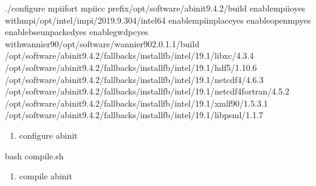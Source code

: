 \documentclass[a4paper,12pt,english]{sphinxmanual}
\begin{document}
\begin{sphinxVerbatim}[commandchars=\\\{\}]
./configure mpiifort mpiicc 
\PYGZhy{}\PYGZhy{}prefix/opt/software/abinit\PYGZhy{}9.4.2/build 
\PYGZhy{}\PYGZhy{}enable\PYGZhy{}mpi\PYGZhy{}ioyes 
\PYGZhy{}\PYGZhy{}with\PYGZhy{}mpi/opt/intel/impi/2019.9.304/intel64 
\PYGZhy{}\PYGZhy{}enable\PYGZhy{}mpi\PYGZhy{}inplaceyes 
\PYGZhy{}\PYGZhy{}enable\PYGZhy{}openmpyes 
\PYGZhy{}\PYGZhy{}enable\PYGZhy{}bse\PYGZhy{}unpackedyes 
\PYGZhy{}\PYGZhy{}enable\PYGZhy{}gw\PYGZhy{}dpcyes 
\PYGZhy{}\PYGZhy{}with\PYGZhy{}wannier90/opt/software/wannier90\PYGZhy{}2.0.1.1/build 
/opt/software/abinit\PYGZhy{}9.4.2/fallbacks/install\PYGZus{}fb/intel/19.1/libxc/4.3.4 
/opt/software/abinit\PYGZhy{}9.4.2/fallbacks/install\PYGZus{}fb/intel/19.1/hdf5/1.10.6 
/opt/software/abinit\PYGZhy{}9.4.2/fallbacks/install\PYGZus{}fb/intel/19.1/netcdf4/4.6.3 
/opt/software/abinit\PYGZhy{}9.4.2/fallbacks/install\PYGZus{}fb/intel/19.1/netcdf4\PYGZus{}fortran/4.5.2 
/opt/software/abinit\PYGZhy{}9.4.2/fallbacks/install\PYGZus{}fb/intel/19.1/xmlf90/1.5.3.1 
/opt/software/abinit\PYGZhy{}9.4.2/fallbacks/install\PYGZus{}fb/intel/19.1/libpsml/1.1.7
\end{sphinxVerbatim}
\begin{enumerate}
%
\setcounter{enumi}{4}
\item {} 
\sphinxAtStartPar
configure abinit

\end{enumerate}

\begin{sphinxVerbatim}[commandchars=\\\{\}]
bash compile.sh
\end{sphinxVerbatim}
\begin{enumerate}
%
\setcounter{enumi}{5}
\item {} 
\sphinxAtStartPar
compile abinit

\end{enumerate}
\end{document}
